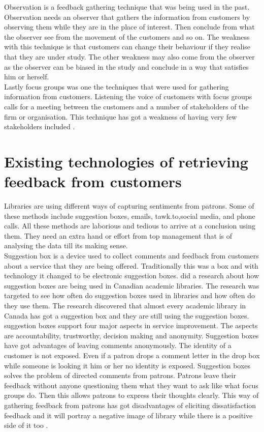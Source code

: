 \documentclass[12pt]{report}
\begin{document}
Observation is a feedback gathering technique that was being used in the past. Observation needs an observer that gathers the information from customers by observing them while they are in the place of interest. Then conclude from what the observer see from the movement of the customers and so on. The weakness with this technique is that customers can change their behaviour if they realise that they are under study. The other weakness may also come from the observer as the observer can be biased in the study and conclude in a way that satisfies him or herself.\\

Lastly focus groups was one the techniques that were used for gathering information from customers. Listening the voice of customers with focus groups calls for a meeting between the customers and a number of stakeholders of the firm or organisation. This technique has got a weakness of having very few stakeholders included \cite{Cc}.\\


\section{Existing technologies of retrieving feedback from customers}
	Libraries are using different ways of capturing sentiments from patrons. Some of these methods include suggestion boxes, emails, tawk.to,social media, and phone calls. All these methods are laborious and tedious to arrive at a conclusion using them. They need an extra hand or effort from top management that is of analysing the data till its making sense.\\
	
	Suggestion box is a device used to collect comments and feedback from customers about a service that they are being offered. Traditionally this was a box and with technology it changed to be electronic suggestion boxes. \cite{farnum2011can} did a research about how suggestion boxes are being used in Canadian academic libraries. The research was targeted to see how often do suggestion boxes used in libraries and how often do they use them. The research discovered that almost every academic library in Canada has got a suggestion box and they are still using the suggestion boxes. \cite{farnum2011can} suggestion boxes support four major aspects in service improvement. The aspects are accountability, trustworthy, decision making and anonymity. Suggestion boxes have got advantages of leaving comments anonymously. The identity of a customer is not exposed. Even if a patron drops a comment letter in the drop box while someone is looking it him or her no identity is exposed.  Suggestion boxes solves the problem of directed comments from patrons. Patrons leave their feedback without anyone questioning them what they want to ask like what focus groups do. Then this allows patrons to express their thoughts clearly. This way of gathering feedback from patrons has got disadvantages of eliciting dissatisfaction feedback and it will portray a negative image of library while there is a positive side of it too \citep{shenton2007library}. \\
	
\end{document}
